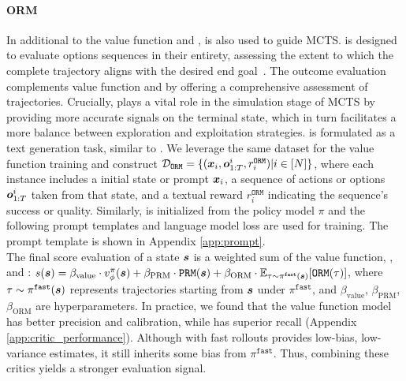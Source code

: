 \paragraph{ORM} In additional to the value function and \prm{}, \orm{} is also used to guide MCTS. \orm{} is designed to evaluate options sequences in their entirety, assessing the extent to which the complete trajectory aligns with the desired end goal~\citep{uesato2022solving,lightman2023let,wang2023math,feng2023alphazero}. The outcome evaluation complements value function and \prm{} by offering a comprehensive assessment of trajectories. Crucially, \orm{} plays a vital role in the simulation stage of MCTS by providing more accurate signals on the terminal state, which in turn facilitates a more balance between exploration and exploitation strategies. \orm{} is formulated as a text generation task, similar to \prm{}. We leverage the same dataset for the value function training and construct ${\mathcal{D}}_{\mathtt{ORM}} = \{ ({\bm{x}}_i, {\bm{o}}_{1:T}^i, r_i^{\mathtt{ORM}}) | i\in[N]\}$, where each instance includes a initial state or prompt ${\bm{x}}_i$, a sequence of actions or options ${\bm{o}}_{1:T}^i$ taken from that state, and a textual reward $r_i^{\mathtt{ORM}}$ indicating the sequence's success or quality. Similarly, \orm{} is initialized from the policy model $\pi$ and the following prompt templates and language model loss are used for training. The prompt template is shown in Appendix \ref{app:prompt}. \\



The final score evaluation of a state ${\bm{s}}$ is a weighted sum of the value function, \prm{}, and \orm{}: $s({\bm{s}}) = \beta_{\text{value}} \cdot v_\phi^\pi({\bm{s}}) + \beta_{\text{PRM}} \cdot \texttt{PRM}{}({\bm{s}}) + \beta_{\text{ORM}} \cdot \mathbb{E}_{\tau \sim \pi^{\mathtt{fast}}({\bm{s}})} [\texttt{ORM}{}(\tau)]$, where $\tau \sim \pi^{\mathtt{fast}}({\bm{s}})$ represents trajectories starting from ${\bm{s}}$ under $\pi^{\mathtt{fast}}$, and $\beta_{\text{value}}$, $\beta_{\text{PRM}}$, $\beta_{\text{ORM}}$ are hyperparameters. In practice, we found that the value function model has better precision and calibration, while \prm{} has superior recall (Appendix \ref{app:critic_performance}). Although \orm{} with fast rollouts provides low-bias, low-variance estimates, it still inherits some bias from $\pi^{\mathtt{fast}}$. Thus, combining these critics yields a stronger evaluation signal.

